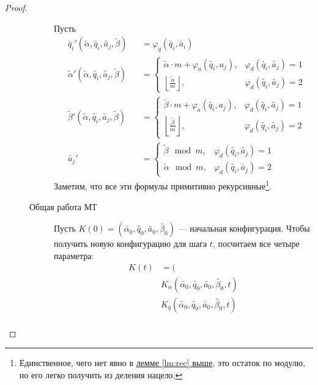 \begin{proof}
\begin{description}
\begin{description}
			Пусть 
			\[
			\begin{aligned}
				&\widetilde{ q_i}'  (\widetilde{ \alpha } , \widetilde{ q_i}, \widetilde{ a_j} , \widetilde{ \beta } ) &&= \varphi_{q}(\widetilde{ q_i} , \widetilde{ a_i} ) \\
				&\widetilde{ \alpha } ' (\widetilde{ \alpha } , \widetilde{ q_i} , \widetilde{ a_j} , \widetilde{ \beta } ) &&= 
				\begin{cases}
					\widetilde{ \alpha } \cdot m + \varphi_{a}(\widetilde{ q_i} , a_j), & \varphi _{d}(\widetilde{ q_i} ,\widetilde{ a_j} ) = 1 \\
					\left\lfloor \frac{\widetilde{ \alpha } }{m} \right\rfloor, & \varphi _{d}(\widetilde{ q_i} ,\widetilde{ a_j} ) = 2
				\end{cases}
					\\
				&\widetilde{ \beta } ' (\widetilde{ \alpha } , \widetilde{ q_i} , \widetilde{ a_j} , \widetilde{ \beta } ) &&= 
				\begin{cases}
					\widetilde{ \beta } \cdot m + \varphi_{a}(\widetilde{ q_i} , a_j), & \varphi _{d}(\widetilde{ q_i} ,\widetilde{ a_j} ) = 1 \\
					\left\lfloor \frac{\widetilde{ \beta } }{m} \right\rfloor, & \varphi _{d}(\widetilde{ q_i} ,\widetilde{ a_j} ) = 2
				\end{cases}
		\\
				& \widetilde{ a_j} ' &&= 
		\begin{cases}
			\widetilde{ \beta }  \mod m, & \varphi _{d}(\widetilde{ q_i} ,\widetilde{ a_j} ) = 1 \\
			\widetilde{ \alpha  }  \mod m, & \varphi _{d}(\widetilde{ q_i} ,\widetilde{ a_j} ) = 2 
		\end{cases}
			\end{aligned}
	\]
	Заметим, что все эти формулы примитивно рекурсивные\footnote{Единственное, чего нет явно в \hyperref[lm:rec]{лемме \ref{lm:rec} выше}, это остаток по модулю, но его легко получить из деления нацело.}.
\item[Общая работа МТ]
	Пусть $ K(0) = \left( \widetilde{ \alpha _0} , \widetilde{ q_0}, \widetilde{ a_0} , \widetilde{ \beta _0} \right) $ --- начальная конфигурация.
	Чтобы получить новую конфигурацию для шага $ t$, посчитаем все четыре параметра:
	\[
	\begin{aligned}
		K(t) &= ( \\
			 &K_{ \alpha }(\widetilde{ \alpha_0} , \widetilde{ q_0} , \widetilde{ a_0}, \widetilde{ \beta_0}, t) \\ 
			 &K_{ q }(\widetilde{ \alpha_0} , \widetilde{ q_0} , \widetilde{ a_0}, \widetilde{ \beta_0}, t) \\ 

\end{aligned}\]
\end{description}
\end{description}
\end{proof}
